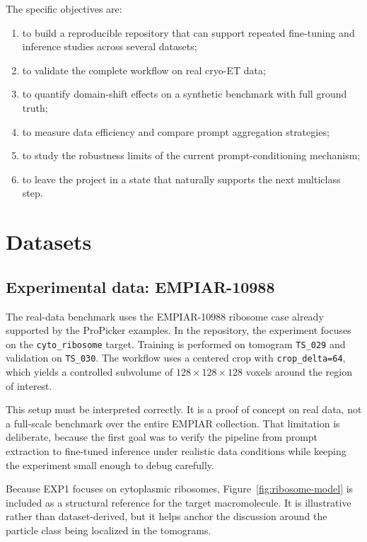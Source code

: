 \documentclass[12pt,a4paper]{report}
\begin{document}
The specific objectives are:
\begin{enumerate}
  \item to build a reproducible repository that can support repeated fine-tuning and inference studies across several datasets;
  \item to validate the complete workflow on real cryo-ET data;
  \item to quantify domain-shift effects on a synthetic benchmark with full ground truth;
  \item to measure data efficiency and compare prompt aggregation strategies;
  \item to study the robustness limits of the current prompt-conditioning mechanism;
  \item to leave the project in a state that naturally supports the next multiclass step.
\end{enumerate}

\section{Datasets}

\subsection{Experimental data: EMPIAR-10988}
The real-data benchmark uses the EMPIAR-10988 ribosome case already supported by the ProPicker examples. In the repository, the experiment focuses on the \texttt{cyto\_ribosome} target. Training is performed on tomogram \texttt{TS\_029} and validation on \texttt{TS\_030}. The workflow uses a centered crop with \texttt{crop\_delta=64}, which yields a controlled subvolume of \(128 \times 128 \times 128\) voxels around the region of interest.

This setup must be interpreted correctly. It is a proof of concept on real data, not a full-scale benchmark over the entire EMPIAR collection. That limitation is deliberate, because the first goal was to verify the pipeline from prompt extraction to fine-tuned inference under realistic data conditions while keeping the experiment small enough to debug carefully.

Because EXP1 focuses on cytoplasmic ribosomes, Figure~\ref{fig:ribosome-model} is included as a structural reference for the target macromolecule. It is illustrative rather than dataset-derived, but it helps anchor the discussion around the particle class being localized in the tomograms.
\end{document}
